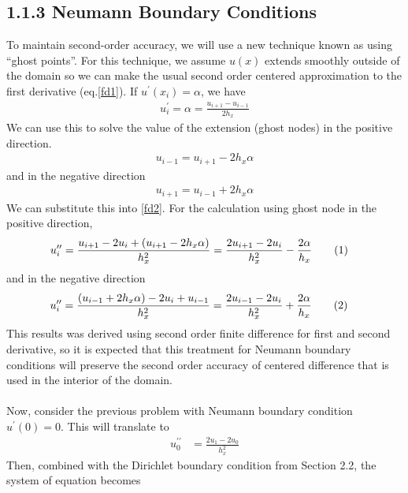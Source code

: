 \documentclass[11pt, letterpaper, hidelinks]{article}
\theoremstyle{definition}
\newcommand\numberthis{\addtocounter{equation}{1}\tag{\theequation}}
\begin{document}
\subsection{1.1.3 Neumann Boundary Conditions}
To maintain second-order accuracy, we will use a new technique known as using “ghost points”. For this technique, we assume $u(x)$ extends smoothly outside of the domain so we can make the usual second order centered approximation to the first derivative (eq.\eqref{fd1}). If $u^\prime(x_i) = \alpha$, we have
\begin{align*}
    u^\prime_i = \alpha = \frac{u_{i+1}-u_{i-1}}{2h_x}
\end{align*}
We can use this to solve the value of the extension (ghost nodes) in the positive direction.
\begin{align*}
    u_{i-1} = u_{i+1}-2h_x\alpha
\end{align*}
and in the negative direction
\begin{align*}
    u_{i+1} = u_{i-1}+2h_x\alpha
\end{align*}
We can substitute this into \eqref{fd2}. For the calculation using ghost node in the positive direction,
\begin{align*}
    u^{\prime\prime}_i & = \frac{u_{i+1} -2u_i + (u_{i+1}-2h_x\alpha)}{h_x^2} = \frac{2u_{i+1} -2u_i}{h_x^2} - \frac{2\alpha}{h_x} \numberthis \label{nb1}
\end{align*}
and in the negative direction
\begin{align*}
    u^{\prime\prime}_i & = \frac{(u_{i-1}+2h_x\alpha) -2u_i + u_{i-1}}{h_x^2} = \frac{2u_{i-1} -2u_i}{h_x^2} + \frac{2\alpha}{h_x} \numberthis \label{nb2}
\end{align*}
This results was derived using second order finite difference for first and second derivative, so it is expected that this treatment for Neumann boundary conditions will preserve the second order accuracy of centered difference that is used in the interior of the domain. \\ \\
%
Now, consider the previous problem with Neumann boundary condition $u^\prime(0) = 0$. This will translate to
\begin{align*}
    u^{\prime\prime}_0 & = \frac{2u_{1} -2u_0}{h_x^2}
\end{align*}
Then, combined with the Dirichlet boundary condition from Section 2.2, the system of equation becomes
\end{document}
